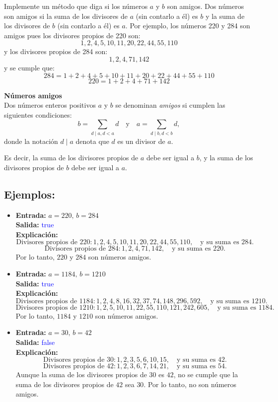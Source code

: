Implemente un método que diga si los números $a$ y $b$ son amigos. Dos números son amigos si la suma de los divisores de $a$ (sin contarlo a él) es $b$ y la suma de los divisores de $b$ (sin contarlo a él) es $a$. Por ejemplo, los números 220 y 284 son amigos pues los divisores propios de 220 son:
\[
1, 2, 4, 5, 10, 11, 20, 22, 44, 55, 110
\]
y los divisores propios de 284 son:
\[
1, 2, 4, 71, 142
\]
y se cumple que:
\[
284 = 1 + 2 + 4 + 5 + 10 + 11 + 20 + 22 + 44 + 55 + 110
\]
\[
220 = 1 + 2 + 4 + 71 + 142
\]

\item \textbf{Números amigos}\\
Dos números enteros positivos \( a \) y \( b \) se denominan \textit{amigos} si cumplen las siguientes condiciones:
\[
b = \sum_{d \mid a, d < a}d \quad \text{y} \quad a = \sum_{d \mid b, d < b} d,
\]
donde la notación \( d \mid a \) denota que \( d \) es un divisor de \( a \). 

Es decir, la suma de los divisores propios de \( a \) debe ser igual a \( b \), y la suma de los divisores propios de \( b \) debe ser igual a \( a \).

\subsection*{Ejemplos:}
\begin{itemize}
    \item \textbf{Entrada:} \( a = 220, \, b = 284 \)\\
    \textbf{Salida:} \textcolor{blue}{true}\\
    \textbf{Explicación:}
    \[
    \text{Divisores propios de } 220: 1, 2, 4, 5, 10, 11, 20, 22, 44, 55, 110, \quad \text{y su suma es } 284.
    \]
    \[
    \text{Divisores propios de } 284: 1, 2, 4, 71, 142, \quad \text{y su suma es } 220.
    \]
    Por lo tanto, \( 220 \) y \( 284 \) son números amigos.

    \item \textbf{Entrada:} \( a = 1184, \, b = 1210 \)\\
    \textbf{Salida:} \textcolor{blue}{true}\\
    \textbf{Explicación:}
    \[
    \text{Divisores propios de } 1184: 1, 2, 4, 8, 16, 32, 37, 74, 148, 296, 592, \quad \text{y su suma es } 1210.
    \]
    \[
    \text{Divisores propios de } 1210: 1, 2, 5, 10, 11, 22, 55, 110, 121, 242, 605, \quad \text{y su suma es } 1184.
    \]
    Por lo tanto, \( 1184 \) y \( 1210 \) son números amigos.

    \item \textbf{Entrada:} \( a = 30, \, b = 42 \)\\
    \textbf{Salida:} \textcolor{blue}{false}\\
    \textbf{Explicación:}
    \[
    \text{Divisores propios de } 30: 1, 2, 3, 5, 6, 10, 15, \quad \text{y su suma es } 42.
    \]
    \[
    \text{Divisores propios de } 42: 1, 2, 3, 6, 7, 14, 21, \quad \text{y su suma es } 54.
    \]
    Aunque la suma de los divisores propios de \( 30 \) es \( 42 \), no se cumple que la suma de los divisores propios de \( 42 \) sea \( 30 \). Por lo tanto, no son números amigos.
\end{itemize}
